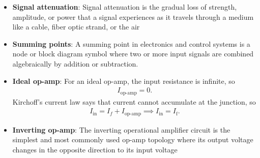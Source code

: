 \documentclass{report}
\begin{document}
\begin{itemize}
            Notice that
            \begin{align*}
                V_{-} = I_{F}R_{2}
            .\end{align*}
            Thus,
            \begin{align*}
                V_{-} = V_{\text{out}}\frac{R_{2}}{R_{F} + R_{2}}
            .\end{align*}
            Since $V_{-} \approx V_{+} = V_{\text{in}} $,
            \begin{align*}
                V_{\text{in}} \approx V_{\text{out}}\frac{R_{2}}{R_{F} + R_{2}}
            .\end{align*}
            Hence,
            \begin{align*}
                V_{\text{out}} = V_{\text{in}}\left(1+\frac{R_{F}}{R_{2}}\right)
            .\end{align*}
            The gain is then
            \begin{align*}
                A = \frac{V_{\text{out}}}{V_{\text{in}}} = \frac{R_{F}}{R_{2}} + 1
            .\end{align*}
            The main point of a non-inverting op-amp is to amplify an input signal while keeping its original polarity and phase. 
        \item \textbf{Signal attenuation}: Signal attenuation is the gradual loss of strength, amplitude, or power that a signal experiences as it travels through a medium like a cable, fiber optic strand, or the air
        \item \textbf{Summing points}: A summing point in electronics and control systems is a node or block diagram symbol where two or more input signals are combined algebraically by addition or subtraction.
        \item \textbf{Ideal op-amp}: For an ideal op-amp, the input resistance is infinite, so
            \begin{align*}
                I_{\text{op-amp}} = 0
            .\end{align*}
            Kirchoff's current law says that current cannot accumulate at the junction, so
            \begin{align*}
                I_{\text{in}} = I_{f} + I_{\text{op-amp}} \implies I_{\text{in}} = I_{\text{f}}
            .\end{align*}
        \item \textbf{Inverting op-amp}: The inverting operational amplifier circuit is the simplest and most commonly used op-amp topology where its output voltage changes in the opposite direction to its input voltage

\end{itemize}
\end{document}
